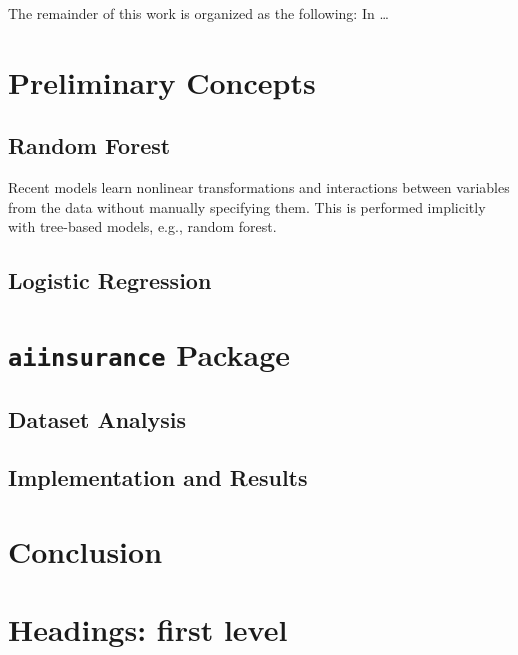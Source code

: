 \documentclass{article}
\begin{document}
The remainder of this work is organized as the following: In \ldots{}

\cite{package}

\hypertarget{preliminary-concepts}{%
\section{Preliminary Concepts}\label{preliminary-concepts}}

\hypertarget{random-forest}{%
\subsection{Random Forest}\label{random-forest}}

Recent models learn nonlinear transformations and interactions between
variables from the data without manually specifying them. This is
performed implicitly with tree-based models, e.g., random forest.

\hypertarget{logistic-regression}{%
\subsection{Logistic Regression}\label{logistic-regression}}

\hypertarget{aiinsurance-package}{%
\section{\texorpdfstring{\texttt{aiinsurance}
Package}{aiinsurance Package}}\label{aiinsurance-package}}

\hypertarget{dataset-analysis}{%
\subsection{Dataset Analysis}\label{dataset-analysis}}

\hypertarget{implementation-and-results}{%
\subsection{Implementation and
Results}\label{implementation-and-results}}

\hypertarget{conclusion}{%
\section{Conclusion}\label{conclusion}}

\newpage

\hypertarget{headings-first-level}{%
\section{Headings: first level}\label{headings-first-level}}
\end{document}
